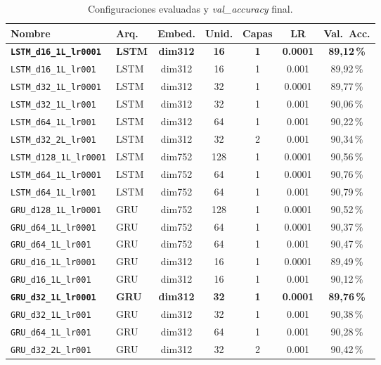 \documentclass{article}
\begin{document}
\begin{table}[H]
    \centering
    \small %
    \setlength{\tabcolsep}{3.5pt} %
    \renewcommand{\arraystretch}{0.95} %
    
    \begin{tabular}{llccccc}
        \toprule
        Nombre & Arq. & Embed. & Unid. & Capas & LR & Val.\ Acc. \\ %
        \midrule
        \textbf{\texttt{LSTM\_d16\_1L\_lr0001}} & \textbf{LSTM} & \textbf{dim312} & \textbf{16} & \textbf{1} & \textbf{0.0001} & \textbf{89,12\,\%} \\
        \texttt{LSTM\_d16\_1L\_lr001}   & LSTM & dim312 & 16  & 1 & 0.001   & 89,92\,\% \\
        \texttt{LSTM\_d32\_1L\_lr0001}  & LSTM & dim312 & 32  & 1 & 0.0001  & 89,77\,\% \\
        \texttt{LSTM\_d32\_1L\_lr001}   & LSTM & dim312 & 32  & 1 & 0.001   & 90,06\,\% \\
        \texttt{LSTM\_d64\_1L\_lr001}   & LSTM & dim312 & 64  & 1 & 0.001   & 90,22\,\% \\
        \texttt{LSTM\_d32\_2L\_lr001}   & LSTM & dim312 & 32  & 2 & 0.001   & 90,34\,\% \\
        \texttt{LSTM\_d128\_1L\_lr0001} & LSTM & dim752 & 128 & 1 & 0.0001  & 90,56\,\% \\
        \texttt{LSTM\_d64\_1L\_lr0001}  & LSTM & dim752 & 64  & 1 & 0.0001  & 90,76\,\% \\
        \texttt{LSTM\_d64\_1L\_lr001}   & LSTM & dim752 & 64  & 1 & 0.001   & 90,79\,\% \\
        \texttt{GRU\_d128\_1L\_lr0001}  & GRU  & dim752 & 128 & 1 & 0.0001  & 90,52\,\% \\
        \texttt{GRU\_d64\_1L\_lr0001}   & GRU  & dim752 & 64  & 1 & 0.0001  & 90,37\,\% \\
        \texttt{GRU\_d64\_1L\_lr001}    & GRU  & dim752 & 64  & 1 & 0.001   & 90,47\,\% \\
        \texttt{GRU\_d16\_1L\_lr0001}   & GRU  & dim312 & 16  & 1 & 0.0001  & 89,49\,\% \\
        \texttt{GRU\_d16\_1L\_lr001}    & GRU  & dim312 & 16  & 1 & 0.001   & 90,12\,\% \\
        \textbf{\texttt{GRU\_d32\_1L\_lr0001}} & \textbf{GRU} & \textbf{dim312} & \textbf{32} & \textbf{1} & \textbf{0.0001} & \textbf{89,76\,\%} \\
        \texttt{GRU\_d32\_1L\_lr001}    & GRU  & dim312 & 32  & 1 & 0.001   & 90,38\,\% \\
        \texttt{GRU\_d64\_1L\_lr001}    & GRU  & dim312 & 64  & 1 & 0.001   & 90,28\,\% \\
        \texttt{GRU\_d32\_2L\_lr001}    & GRU  & dim312 & 32  & 2 & 0.001   & 90,42\,\% \\
        \bottomrule
    \end{tabular}
  \caption{Configuraciones evaluadas y \textit{val\_accuracy} final.}
  \label{tab:resultados}
\end{table}
\end{document}
